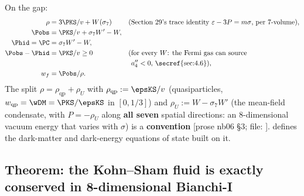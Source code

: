 On the gap:
\begin{align*}
  \rho&=3\PKS/v+W(\sigma_7) &&\text{(Section~29's trace identity $\varepsilon-3P=m\sigma$, per 7-volume)},\\
  \Pobs&=\PKS/v+\sigma_7W'-W,\\
  \Phid=\PC&=\sigma_7W'-W,\\
  \Pobs-\Phid&=\PKS/v\geq0 &&\text{(for every $W$: the Fermi gas can source}\\
  & &&\text{\phantom{(}$a_4''<0$, \secref{sec:4.6})},\\
  w_f&=\Pobs/\rho .
\end{align*}
The split $\rho=\rho_{\mathrm{qp}}+\rho_U$ with $\rho_{\mathrm{qp}}:=\epsKS/v$ (quasiparticles,
$w_{\mathrm{qp}}=\wDM=\PKS/\epsKS$ in $[0,1/3]$) and $\rho_U:=W-\sigma_7W'$ (the mean-field condensate,
with $P=-\rho_U$ along \textbf{all seven} spatial directions: an 8-dimensional vacuum energy that varies
with $\sigma$) is a \textbf{convention} [prose nb06 \S3; file: ].
 defines the dark-matter and dark-energy equations of state built on it.

\subsection{Theorem: the Kohn--Sham fluid is exactly conserved in 8-dimensional Bianchi-I}
\label{sec:7.5}

